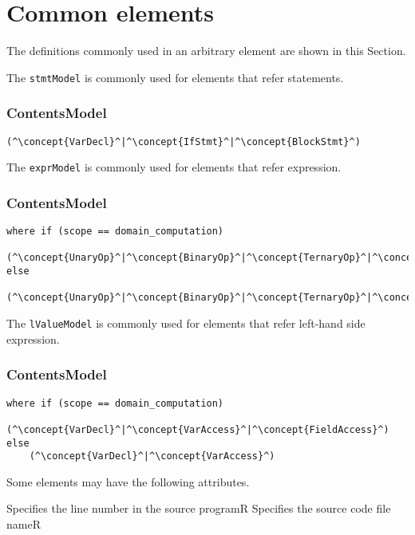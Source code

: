 \section{Common elements}
The definitions commonly used in an arbitrary element are shown in this Section.

The {\tt stmtModel} is commonly used for elements that refer statements.

\subsubsection*{ContentsModel}{}

\begin{lstlisting}[style=default,frame=none]
(^\concept{VarDecl}^|^\concept{IfStmt}^|^\concept{BlockStmt}^)
\end{lstlisting}


The {\tt exprModel} is commonly used for elements that refer expression.

\subsubsection*{ContentsModel}{}

\begin{lstlisting}[style=default,frame=none]
where if (scope == domain_computation)    
    (^\concept{UnaryOp}^|^\concept{BinaryOp}^|^\concept{TernaryOp}^|^\concept{Literal}^|^\concept{FieldAccess}^|^\concept{VarAccess}^)
else
    (^\concept{UnaryOp}^|^\concept{BinaryOp}^|^\concept{TernaryOp}^|^\concept{VarAccess}^|^\concept{Literal}^)
\end{lstlisting}


The {\tt lValueModel} is commonly used for elements that refer left-hand side
expression.

\subsubsection*{ContentsModel}{}

\begin{lstlisting}[style=default,frame=none]
where if (scope == domain_computation)    
    (^\concept{VarDecl}^|^\concept{VarAccess}^|^\concept{FieldAccess}^)
else
    (^\concept{VarDecl}^|^\concept{VarAccess}^)
\end{lstlisting}



Some elements may have the following attributes. 
\begin{HIRAttributes}
    {Specifies the line number in the source program}{R}
    {Specifies the source code file name}{R}
\end{HIRAttributes}

